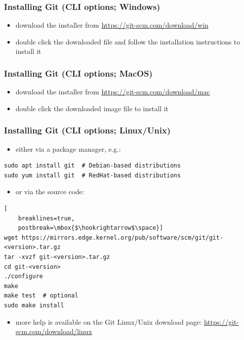 \begin{frame}
\frametitle{Installing Git (CLI options; Windows)}
\begin{itemize}
    \item download the installer from \url{https://git-scm.com/download/win}
    \item double click the downloaded  file and follow the
        installation instructions to install it
\end{itemize}
\end{frame}


\begin{frame}
\frametitle{Installing Git (CLI options; MacOS)}
\begin{itemize}
    \item download the installer from \url{https://git-scm.com/download/mac}
    \item double click the downloaded image file to install it
\end{itemize}
\end{frame}


\begin{frame}[fragile]
\frametitle{Installing Git (CLI options; Linux/Unix)}
\begin{itemize}
    \item either via a package manager, e.g.:
\end{itemize}

\begin{lstlisting}
sudo apt install git  # Debian-based distributions
sudo yum install git  # RedHat-based distributions
\end{lstlisting}

\begin{itemize}
    \item or via the source code:
\end{itemize}

\begin{lstlisting}[
    breaklines=true,
    postbreak=\mbox{$\hookrightarrow$\space}]
wget https://mirrors.edge.kernel.org/pub/software/scm/git/git-<version>.tar.gz
tar -xvzf git-<version>.tar.gz
cd git-<version>
./configure
make
make test  # optional
sudo make install
\end{lstlisting}

\begin{itemize}
    \item more help is available on the Git Linux/Unix download page:
        \url{https://git-scm.com/download/linux}
\end{itemize}
\end{frame}

